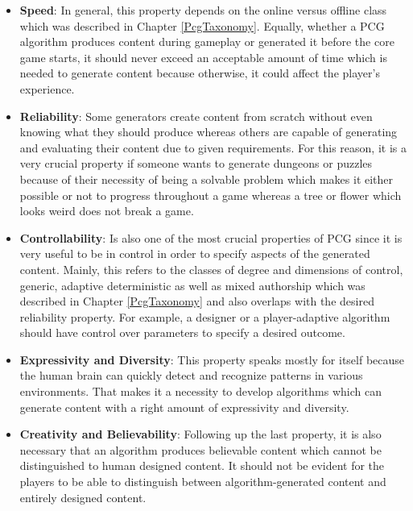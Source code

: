 \documentclass[MGS,Master,english]{twbook}%
\begin{document}
\begin{itemize}
	\item \textbf{Speed}: In general, this property depends on the online versus offline class which was described in Chapter \ref{PcgTaxonomy}. Equally, whether a PCG algorithm produces content during gameplay or generated it before the core game starts, it should never exceed an acceptable amount of time which is needed to generate content because otherwise, it could affect the player’s experience. \cite{pcg::book}
	\item \textbf{Reliability}: Some generators create content from scratch without even knowing what they should produce whereas others are capable of generating and evaluating their content due to given requirements. For this reason, it is a very crucial property if someone wants to generate dungeons or puzzles because of their necessity of being a solvable problem which makes it either possible or not to progress throughout a game whereas a tree or flower which looks weird does not break a game. \cite{pcg::book}
	\item \textbf{Controllability}: Is also one of the most crucial properties of PCG since it is very useful to be in control in order to specify aspects of the generated content. Mainly, this refers to the classes of degree and dimensions of control, generic, adaptive deterministic as well as mixed authorship which was described in Chapter \ref{PcgTaxonomy} and also overlaps with the desired reliability property. For example, a designer or a player-adaptive algorithm should have control over parameters to specify a desired outcome. \cite{pcg::book}
	\item \textbf{Expressivity and Diversity}: This property speaks mostly for itself because the human brain can quickly detect and recognize patterns in various environments. That makes it a necessity to develop algorithms which can generate content with a right amount of expressivity and diversity. \cite{pcg::book}
	\item \textbf{Creativity and Believability}: Following up the last property, it is also necessary that an algorithm produces believable content which cannot be distinguished to human designed content. It should not be evident for the players to be able to distinguish between algorithm-generated content and entirely designed content. \cite{pcg::book}
\end{itemize}
\end{document}
